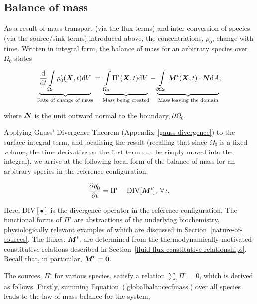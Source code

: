 \subsection{Balance of mass}
\label{balance-of-mass}

As a result of mass transport (via the flux terms) and
inter-conversion of species (via the source/sink terms) introduced
above, the concentrations, $\rho_0^\iota$, change with time. Written
in integral form, the balance of mass for an arbitrary species over
$\Omega_0$ states

\begin{equation}
\underbrace{\frac{\mathrm{d}}{\mathrm{d}t} \int\limits_{\Omega_0}
  \rho_0^\iota (\mbox{\boldmath$ X$},t)\mathrm{d}V}_{\text{Rate of change of mass}} =
\underbrace{\int\limits_{\Omega_0} \Pi^\iota
  (\mbox{\boldmath$ X$},t)\mathrm{d}V}_{\text{Mass being created}}
-\underbrace{\int\limits_{\partial\Omega_0}\mbox{\boldmath$ M$}^\iota(\mbox{\boldmath$ X$},t)\cdot\mbox{\boldmath$ N$}
  \mathrm{d}A}_{\text{Mass leaving the domain}},
\label{globalbalanceofmass}
\end{equation}

\noindent where $\mbox{\boldmath$ N$}$ is the unit outward normal to the boundary,
$\partial\Omega_0$.

Applying Gauss' Divergence Theorem (Appendix~\ref{gauss-divergence})
to the surface integral term, and localising the result (recalling
that since $\Omega_0$ is a fixed volume, the time derivative on the
first term can be simply moved into the integral), we arrive at the
following local form of the balance of mass for an arbitrary species
in the reference configuration,

\begin{equation}
\frac{\partial\rho_0^\iota}{\partial t} = \Pi^\iota -
\mathrm{DIV}[\mbox{\boldmath$ M$}^\iota],\;\forall\,\iota.
\label{localbalanceofmass}
\end{equation}

\noindent Here, $\mathrm{DIV[\bullet]}$ is the divergence operator in
the reference configuration. The functional forms of $\Pi^\iota$ are
abstractions of the underlying biochemistry, physiologically relevant
examples of which are discussed in
Section~\ref{nature-of-sources}. The fluxes, $\mbox{\boldmath$ M$}^\iota$, are
determined from the thermodynamically-motivated constitutive relations
described in
Section~\ref{fluid-flux-constitutive-relationships}. Recall that, in
particular, $\mbox{\boldmath$ M$}^{c} = {\bf 0}$.

The sources, $\Pi^\iota$ for various species, satisfy a relation
$\sum\limits_\iota\Pi^\iota = 0$, which is derived as
follows. Firstly, summing Equation~(\ref{globalbalanceofmass}) over
all species leads to the law of mass balance for the system,

